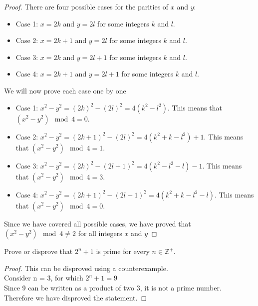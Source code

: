 \documentclass[a4paper]{exam}
\theoremstyle{definition}
\newcommand\Z{\ensuremath{\mathbb{Z}}}
\begin{document}
\begin{questions}
  \begin{solution}
    \begin{proof}

There are four possible cases for the parities of $x$ and $y$:

\begin{itemize}
    \item Case 1: $x = 2k$ and $y = 2l$ for some integers $k$ and $l$.
    \item Case 2: $x = 2k+1$ and $y = 2l$ for some integers $k$ and $l$.
    \item Case 3: $x = 2k$ and $y = 2l+1$ for some integers $k$ and $l$.
    \item Case 4: $x = 2k+1$ and $y = 2l+1$ for some integers $k$ and $l$.
\end{itemize}

We will now prove each case one by one
\begin{itemize}
    \item Case 1: $x^2 - y ^2 = (2k)^2 - (2l)^2 = 4(k^2 - l^2)$. This means that $(x^2 - y^2) \mod 4 = 0$.
    \item Case 2: $x^2 - y^2 = (2k+1)^2 - (2l)^2 = 4(k^2 + k - l^2) + 1$. This means that $(x^2 - y^2) \mod 4 = 1$.
    \item Case 3: $x^2 - y^2 = (2k)^2 - (2l+1)^2 = 4(k^2 - l^2 - l) - 1$. This means that $(x^2 - y^2) \mod 4 = 3$.
    \item Case 4: $x^2 - y^2 = (2k+1)^2 - (2l+1)^2 = 4(k^2 + k - l^2 - l)$. This means that $(x^2 - y^2) \mod 4 = 0$.
\end{itemize}

Since we have covered all possible cases, we have proved that $(x^2 - y^2) \mod 4 \neq 2$ for all integers $x$ and $y$
    \end{proof}
  \end{solution}

\question 
  Prove or disprove that $2^n + 1$ is prime for every $n\in\Z^+$.

  \begin{solution}
    \begin{proof}
      This can be disproved using a counterexample.\\
      Consider n = 3, for which $2^n + 1 = 9$\\
      Since 9 can be written as a product of two $3$, it is not a prime number.\\
      Therefore we have disproved the statement. 
    \end{proof}
  \end{solution}
\end{questions}
\end{document}
